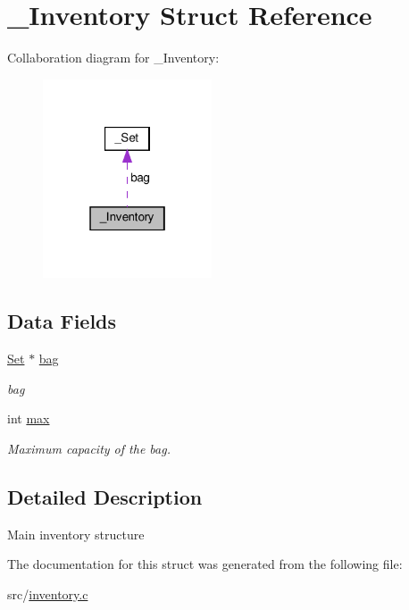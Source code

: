 \hypertarget{struct__Inventory}{}\section{\+\_\+\+Inventory Struct Reference}
\label{struct__Inventory}


Collaboration diagram for \+\_\+\+Inventory\+:\nopagebreak
\begin{figure}[H]
\begin{center}
\leavevmode
\includegraphics[width=142pt]{struct__Inventory__coll__graph}
\end{center}
\end{figure}
\subsection*{Data Fields}
\begin{DoxyCompactItemize}
\item 
\mbox{\label{struct__Inventory_a55f10f4d880ffc99d424d89ede41516f}} 
\hyperlink{set_8h_a6d3b7f7c92cbb4577ef3ef7ddbf93161}{Set} $\ast$ \hyperlink{struct__Inventory_a55f10f4d880ffc99d424d89ede41516f}{bag}
\begin{DoxyCompactList}\small\item\em bag \end{DoxyCompactList}\item 
\mbox{\label{struct__Inventory_ac09bcf212b2c7ff348066b2e5f28bb9c}} 
int \hyperlink{struct__Inventory_ac09bcf212b2c7ff348066b2e5f28bb9c}{max}
\begin{DoxyCompactList}\small\item\em Maximum capacity of the bag. \end{DoxyCompactList}\end{DoxyCompactItemize}


\subsection{Detailed Description}
Main inventory structure 

The documentation for this struct was generated from the following file\+:\begin{DoxyCompactItemize}
\item 
src/\hyperlink{inventory_8c}{inventory.\+c}\end{DoxyCompactItemize}
